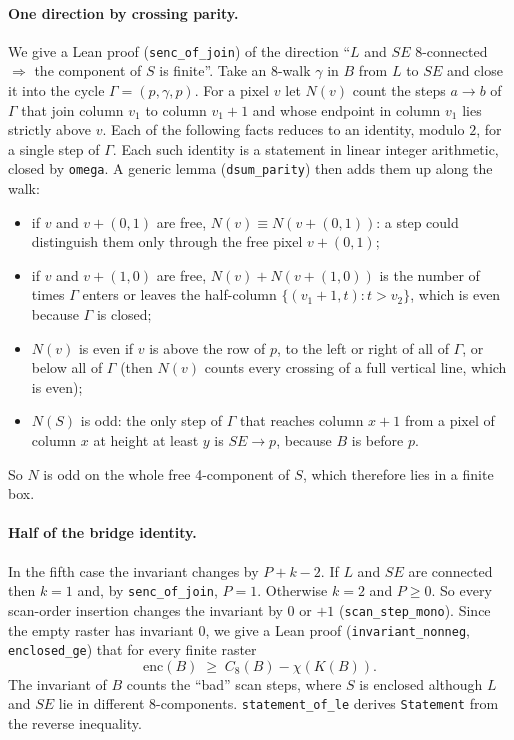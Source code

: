 \documentclass[11pt]{article}
\theoremstyle{definition}
\theoremstyle{remark}
\begin{document}
\paragraph{One direction by crossing parity.} We give a Lean proof
(\texttt{senc\_of\_join}) of the direction ``$L$ and $SE$ 8-connected
$\Rightarrow$ the component of $S$ is finite''. Take an 8-walk $\gamma$ in $B$ from
$L$ to $SE$ and close it into the cycle $\Gamma=(p,\gamma,p)$. For a pixel $v$ let
$N(v)$ count the steps $a\to b$ of $\Gamma$ that join column $v_1$ to column
$v_1+1$ and whose endpoint in column $v_1$ lies strictly above $v$. Each of the
following facts reduces to an identity, modulo $2$, for a single step of $\Gamma$.
Each such identity is a statement in linear integer arithmetic, closed by
\texttt{omega}. A generic lemma (\texttt{dsum\_parity}) then adds them up along the
walk:
\begin{itemize}
\item if $v$ and $v+(0,1)$ are free, $N(v)\equiv N(v+(0,1))$: a step could
  distinguish them only through the free pixel $v+(0,1)$;
\item if $v$ and $v+(1,0)$ are free, $N(v)+N(v+(1,0))$ is the number of times
  $\Gamma$ enters or leaves the half-column $\{(v_1+1,t):t>v_2\}$, which is even
  because $\Gamma$ is closed;
\item $N(v)$ is even if $v$ is above the row of $p$, to the left or right of all of
  $\Gamma$, or below all of $\Gamma$ (then $N(v)$ counts every crossing of a full vertical
  line, which is even);
\item $N(S)$ is odd: the only step of $\Gamma$ that reaches column $x+1$ from a pixel
  of column $x$ at height at least $y$ is $SE\to p$, because $B$ is before $p$.
\end{itemize}
So $N$ is odd on the whole free 4-component of $S$, which therefore lies in a
finite box.

\paragraph{Half of the bridge identity.} In the fifth case the invariant changes by
$P+k-2$. If $L$ and $SE$ are connected then $k=1$ and, by \texttt{senc\_of\_join},
$P=1$. Otherwise $k=2$ and $P\ge0$. So every scan-order insertion changes the
invariant by $0$ or $+1$ (\texttt{scan\_step\_mono}). Since the empty raster has
invariant $0$, we give a Lean proof (\texttt{invariant\_nonneg}, \texttt{enclosed\_ge})
that for every finite raster
\[
  \mathrm{enc}(B) \;\ge\; C_8(B) - \chi(K(B)).
\]
The invariant of $B$ counts the ``bad'' scan steps, where $S$ is enclosed although $L$
and $SE$ lie in different 8-components. \texttt{statement\_of\_le} derives
\texttt{Statement} from the reverse inequality.
\end{document}
